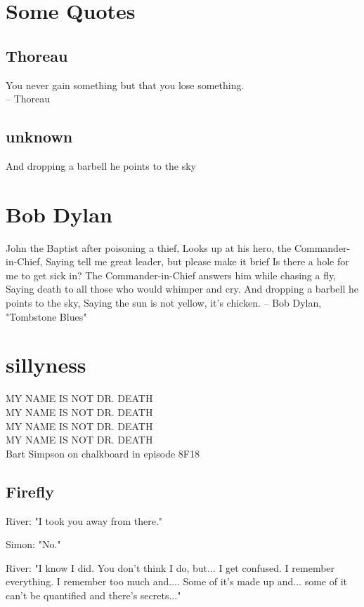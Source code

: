 \documentclass{BGSU}
\begin{document}
\mainmatter %

\chapter{Some Quotes}
\section{Thoreau}
You never gain something but that you lose something.\\
		-- Thoreau
\section{unknown}
And dropping a barbell he points to the sky

\chapter{Bob Dylan}
John the Baptist after poisoning a thief,
Looks up at his hero, the Commander-in-Chief,
Saying tell me great leader, but please make it brief
Is there a hole for me to get sick in?
 The Commander-in-Chief answers him while chasing a fly,
Saying death to all those who would whimper and cry.
And dropping a barbell he points to the sky,
Saying the sun is not yellow, it's chicken.
		-- Bob Dylan, "Tombstone Blues"

\chapter{sillyness}

MY NAME IS NOT DR. DEATH\\
MY NAME IS NOT DR. DEATH\\
MY NAME IS NOT DR. DEATH\\
MY NAME IS NOT DR. DEATH\\

	Bart Simpson on chalkboard in episode 8F18

\section{Firefly}
River: "I took you away from there."

Simon: "No."

River: "I know I did. You don't think I do, but... I get confused. I remember
everything. I remember too much and.... Some of it's made up and... some of
it can't be quantified and there's secrets..."
\end{document}
